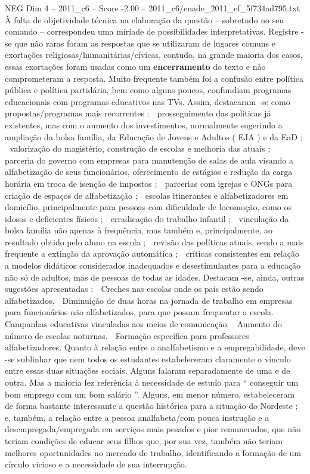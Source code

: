 \begin{textsample}{NEG Dim 4 – 2011\_c6 – Score -2.00 – 2011\_c6/enade\_2011\_ef\_5f734ad795.txt}
À falta de objetividade técnica na elaboração da questão – sobretudo no seu comando – correspondeu uma miríade de possibilidades interpretativas.
Registre -se que não raras foram as respostas que se utilizaram de lugares comuns e exortações religiosas/humanitárias/cívicas, contudo, na grande maioria dos casos, essas exortações foram usadas como um \textbf{encerramento} do texto e não comprometeram a resposta.
Muito frequente também foi a confusão entre política pública e política partidária, bem como alguns poucos, confundiam programas educacionais com programas educativos nas TVs.
Assim, destacaram -se como propostas/programas mais recorrentes :  prosseguimento das políticas já existentes, mas com o aumento dos investimentos, normalmente sugerindo a ampliação da bolsa família, da Educação de Jovens e Adultos ( EJA ) e da EaD ;  valorização do magistério, construção de escolas e melhoria das atuais ;  parceria do governo com empresas para manutenção de salas de aula visando a alfabetização de seus funcionários, oferecimento de estágios e redução da carga horária em troca de isenção de impostos ;  parcerias com igrejas e ONGs para criação de espaços de alfabetização ;  escolas itinerantes e alfabetizadores em domicílio, principalmente para pessoas com dificuldade de locomoção, como os idosos e deficientes físicos ;  erradicação do trabalho infantil ;  vinculação da bolsa família não apenas à frequência, mas também e, principalmente, ao resultado obtido pelo aluno na escola ;  revisão das políticas atuais, sendo a mais frequente a extinção da aprovação automática ;  críticas consistentes em relação a modelos didáticos considerados inadequados e desestimulantes para a educação não só de adultos, mas de pessoas de todas as idades.
Destacam -se, ainda, outras sugestões apresentadas :  Creches nas escolas onde os pais estão sendo alfabetizados.  Diminuição de duas horas na jornada de trabalho em empresas para funcionários não alfabetizados, para que possam frequentar a escola.  Campanhas educativas vinculadas aos meios de comunicação.  Aumento do número de escolas noturnas.  Formação específica para professores alfabetizadores.
Quanto à relação entre o analfabetismo e a empregabilidade, deve -se sublinhar que nem todos os estudantes estabeleceram claramente o vínculo entre essas duas situações sociais.
Alguns falaram separadamente de uma e de outra.
Mas a maioria fez referência à necessidade de estudo para “ conseguir um bom emprego com um bom salário ”.
Alguns, em menor número, estabeleceram de forma bastante interessante a questão histórica para a situação do Nordeste ; e, também, a relação entre a pessoa analfabeta/com pouca instrução e a desempregada/empregada em serviços mais pesados e pior remunerados, que não teriam condições de educar seus filhos que, por sua vez, também não teriam melhores oportunidades no mercado de trabalho, identificando a formação de um círculo vicioso e a necessidade de sua interrupção.

\end{textsample}
